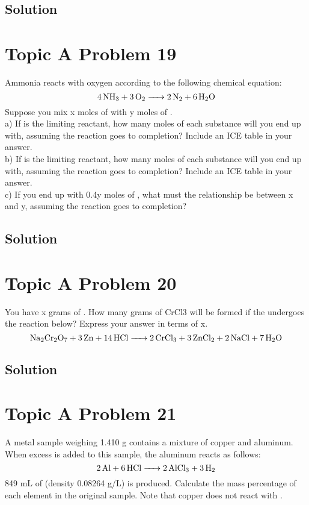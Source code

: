 \documentclass[10pt]{article}
\begin{document}
        \subsection{Solution}

    \pagebreak
    \section{Topic A Problem 19}
        Ammonia reacts with oxygen according to the following chemical equation:
        \begin{equation}
            \ce{4 NH3 + 3 O2 -> 2 N2 + 6 H2O}
        \end{equation}
        Suppose you mix x moles of  with y moles of .\\
        a) If  is the limiting reactant, how many moles of each substance will you end up with, assuming the reaction goes to completion? 
        Include an ICE table in your answer.\\
        b) If  is the limiting reactant, how many moles of each substance will you end up with, assuming the reaction goes to completion? 
        Include an ICE table in your answer.\\
        c) If you end up with 0.4y moles of , what must the relationship be between x and y, assuming the reaction goes to completion?

        \subsection{Solution}

    \pagebreak
    \section{Topic A Problem 20}
        You have x grams of . 
        How many grams of CrCl3 will be formed if the  undergoes the reaction below? 
        Express your answer in terms of x.
        \begin{equation}
            \ce{Na2Cr2O7 + 3 Zn + 14 HCl -> 2 CrCl3 + 3 ZnCl2 + 2 NaCl + 7 H2O}
        \end{equation}

        \subsection{Solution}

    \pagebreak
    \section{Topic A Problem 21}
        A metal sample weighing 1.410 g contains a mixture of copper and aluminum. 
        When excess  is added to this sample, the aluminum reacts as follows:
        \begin{equation}
            \ce{2 Al + 6 HCl -> 2 AlCl3 + 3 H2}
        \end{equation}
        849 mL of  (density 0.08264 g/L) is produced. 
        Calculate the mass percentage of each element in the original sample. 
        Note that copper does not react with .
\end{document}
